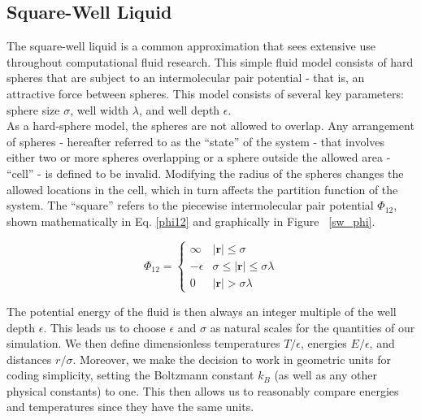 \documentclass[12pt]{article}
\newcommand{\ignore}[1]{}
\renewcommand{\vec}[1]{\mathbf{#1}}
\begin{document}
\ignore{[move me | For simulation purposes, the system is required to have periodic boundary conditions - that is, when a sphere would classically collide with the wall of the cell it instead breaches the wall and then reappears on the other side of the cell with the same velocity.]}

\subsection{Square-Well Liquid}
The square-well liquid is a common approximation that sees extensive use throughout computational fluid research. This simple fluid model consists of hard spheres that are subject to an intermolecular pair potential - that is, an attractive force between spheres. This model consists of several key parameters: sphere size $\sigma$, well width $\lambda$, and well depth $\epsilon$. \\
As a hard-sphere model, the spheres are not allowed to overlap. Any arrangement of spheres - hereafter referred to as the ``state'' of the system - that involves either two or more spheres overlapping or a sphere outside the allowed area - ``cell'' - is defined to be invalid. Modifying the radius of the spheres changes the allowed locations in the cell, which in turn affects the partition function of the system. The ``square'' refers to the piecewise intermolecular pair potential $\Phi_{12}$, shown mathematically in Eq. \ref{phi12} and graphically in Figure ~\ref{sw_phi}.

\begin{equation} 
\Phi_{12} = \begin{cases}\infty & |\vec{r}|\leq \sigma\\ -\epsilon & \sigma \leq |\vec{r}| \leq \sigma\lambda\\ 0 & |\vec{r}| > \sigma\lambda \end{cases}
\label{phi12}
\end{equation}

The potential energy of the fluid is then always an integer multiple of the well depth $\epsilon$. This leads us to choose $\epsilon$ and $\sigma$ as natural scales for the quantities of our simulation. We then define dimensionless temperatures $T/\epsilon$, energies $E/\epsilon$, and distances $r/\sigma$. Moreover, we make the decision to work in geometric units for coding simplicity, setting the Boltzmann constant $k_B$ (as well as any other physical constants) to one. This then allows us to reasonably compare energies and temperatures since they have the same units.
\end{document}
